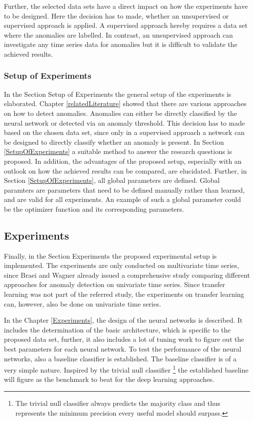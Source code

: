 Further, the selected data sets have a direct impact on how the experiments have to be designed. Here the decision has to made, whether an unsupervised or supervised approach is applied. A supervised approach hereby requires a data set where the anomalies are labelled. In contrast, an unsupervised approach can investigate any time series data for anomalies but it is difficult to validate the achieved results. 

\subsubsection{Setup of Experiments}
In the Section Setup of Experiments the general setup of the experiments is elaborated. Chapter \ref{relatedLiterature} showed that there are various approaches on how to detect anomalies. Anomalies can either be directly classified by the neural network or detected via an anomaly threshold. This decision has to made based on the chosen data set, since only in a supervised approach a network can be designed to directly classify whether an anomaly is present. In Section \ref{SetupOfExperiments} a suitable method to answer the research questions is proposed. In addition, the advantages of the proposed setup, especially with an outlook on how the achieved results can be compared, are elucidated.   
Further, in Section \ref{SetupOfExperiments}, all global parameters are defined. Global paramters are parameters that need to be defined manually rather than learned, and are valid for all experiments. An example of such a global parameter could be the optimizer function and its corresponding parameters.

\subsection{Experiments}
Finally, in the Section Experiments the proposed experimental setup is implemented. The experiments are only conducted on multivariate time series, since Braei and Wagner \parencite*{Braei2020} already issued a comprehensive study comparing different approaches for anomaly detection on univariate time series. Since transfer learning was not part of the referred study, the experiments on transfer learning can, however, also be done on univariate time series. 

In the Chapter \ref{Experiments}, the design of the neural networks is described. It includes the determination of the basic architecture, which is specific to the proposed data set, further, it also includes a lot of tuning work to figure out the best parameters for each neural network. To test the performance of the neural networks, also a baseline classifier is established. The baseline classifier is of a very simple nature. Inspired by the trivial null classifier \footnote{The trivial null classifier always predicts the majority class and thus represents the minimum precision every useful model should surpass.} the established baseline will figure as the benchmark to beat for the deep learning approaches. 

